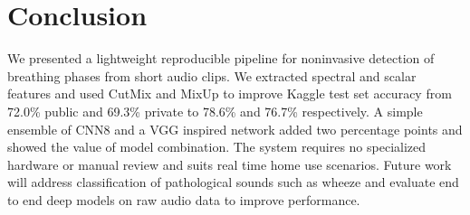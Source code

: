 \section{Conclusion}

We presented a lightweight reproducible pipeline for noninvasive detection of breathing phases from short audio clips. We extracted spectral and scalar features and used CutMix and MixUp to improve Kaggle test set accuracy from 72.0\% public and 69.3\% private to 78.6\% and 76.7\% respectively. A simple ensemble of CNN8 and a VGG inspired network added two percentage points and showed the value of model combination. The system requires no specialized hardware or manual review and suits real time home use scenarios. Future work will address classification of pathological sounds such as wheeze and evaluate end to end deep models on raw audio data to improve performance.
